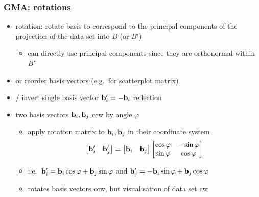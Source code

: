 \documentclass[t]{beamer} %
\begin{document}
\begin{frame}
  \frametitle{GMA: rotations}

  \begin{itemize}
  \item {} rotation: rotate basis to correspond to the principal components of the projection of the data set into $B$ (or $B'$)
    \begin{itemize}
    \item[\hand] can directly use principal components since they are orthonormal within $B'$
    \end{itemize}
  \item {} or reorder basis vectors (\so e.g.\ for scatterplot matrix)
  \item {} / invert single basis vector $\vb'_i = -\vb_i$ \so reflection
  \item {} two basis vectors $\vb_i, \vb_j$ ccw by angle $\varphi$
    \begin{itemize}
    \item[\hand] apply rotation matrix to $\vb_i, \vb_j$ in their coordinate system
      \[
        \begin{bmatrix}
          \vb'_i & \vb'_j
        \end{bmatrix}
        = 
        \begin{bmatrix}
          \vb_i & \vb_j
        \end{bmatrix}
        \begin{bmatrix}
          \cos \varphi & -\sin \varphi \\
          \sin \varphi & \cos \varphi
        \end{bmatrix}
      \]
    \item[\hand] i.e.\ $\vb'_i = \vb_i \cos \varphi + \vb_j \sin \varphi$ and $\vb'_j = -\vb_i \sin \varphi + \vb_j \cos \varphi$ 
    \item[\hand] rotates basis vectors ccw, but visualisation of data set cw
    \end{itemize}
  \end{itemize}
\end{frame}
\end{document}
